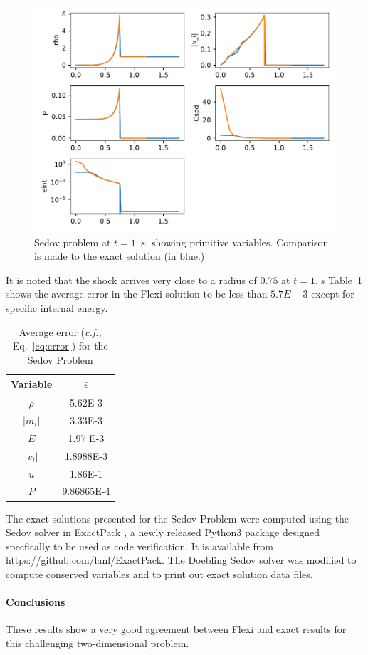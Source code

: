 \begin{figure}[h!]
 \centering
 \includegraphics[scale=0.8]{figures/sedov-PV.pdf}
 \caption{Sedov problem at $t = 1. \ s$, showing primitive variables.  Comparison is made to the exact solution (in blue.)}
 \label{fig:PVsedov}
\end{figure}

\noindent It is noted that the shock arrives very close to a radius of $0.75$ at $t = 1.\ s$  Table~\ref{tab:sedovEps} shows the average error in the Flexi solution to be less than $5.7E-3$ except for specific internal energy.

\begin{table}[h!]
 \centering
 \begin{tabular}{|c|c|} \hline
   Variable & $\bar{\epsilon}$ \\ \hline \hline
   $\rho$ & 5.62E-3\\
   $|m_i|$  & 3.33E-3 \\
   $E$      & 1.97 E-3 \\ \hline
   $|v_i|$  & 1.8988E-3 \\
   $u$     & 1.86E-1 \\
   $P$     & 9.86865E-4 \\ \hline
 \end{tabular}
 \caption{Average error (\textit{c.f.,} Eq.~\ref{eq:error}) for the Sedov Problem}\label{tab:sedovEps}
\end{table}

The exact solutions presented for the Sedov Problem were computed using the Sedov solver in ExactPack \cite{exactpack}, a newly released Python3 package designed specfically to be used as code verification.  It is available from \url{https://github.com/lanl/ExactPack}.  The Doebling Sedov solver was modified to compute conserved variables and to print out exact solution data files.

\paragraph{Conclusions}
These results show a very good agreement between Flexi and exact results for this challenging two-dimensional problem.
